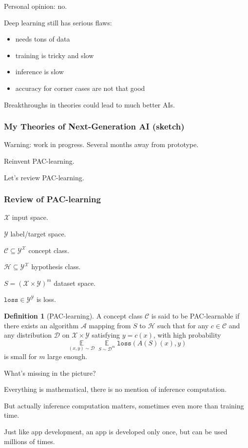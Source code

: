 \documentclass{beamer}   	%
\theoremstyle{definition}
\newtheorem*{defn}{Definition}
\newcommand{\rust}[1]{\texttt{#1}}
\newcommand{\expect}{\mathop{\mathbb{E}}}
\begin{document}
\begin{frame}
Personal opinion: no.

Deep learning still has serious flaws:
\begin{itemize}
	\item needs tons of data
	\item training is tricky and slow
	\item inference is slow
	\item accuracy for corner cases are not that good
\end{itemize}

Breakthroughs in theories could lead to much better AIs.
\end{frame}

\begin{frame}
\frametitle{My Theories of Next-Generation AI (sketch)}

Warning: work in progress. Several months away from prototype.

Reinvent PAC-learning.

Let's review PAC-learning.
\end{frame}

\begin{frame}
\frametitle{Review of PAC-learning}
$\mathcal{X}$ input space.

$\mathcal{Y}$ label/target space.

$\mathcal{C}\subseteq \mathcal{Y}^\mathcal{X}$ concept class.

$\mathcal{H}\subseteq \mathcal{Y}^\mathcal{X}$ hypothesis class.

$S=(\mathcal{X}\times \mathcal{Y})^m$ dataset space.

$\rust{loss}\in \mathcal{Y}^\mathcal{Y}$ is loss.

\begin{defn}[PAC-learning]
A concept class $\mathcal{C}$ is said to be PAC-learnable if there exists an algorithm $\mathcal{A}$ mapping from $S$ to $\mathcal{H}$ such that for any $c\in \mathcal{C}$ and any distribution $\mathcal{D}$ on $\mathcal{X}\times\mathcal{Y}$ satisfying $y=c(x)$, with high probability
\begin{equation}
	\expect\limits_{(x,y)\sim \mathcal{D}}\expect\limits_{S\sim \mathcal{D}^m}\rust{loss}(A(S)(x),y)
\end{equation}
is small for $m$ large enough.
\end{defn}
\end{frame}

\begin{frame}
What's missing in the picture?

\mbox{}

Everything is mathematical, there is no mention of inference computation.

\mbox{}

But actually inference computation matters, sometimes even more than training time.

Just like app development, an app is developed only once, but can be used millions of times.
\end{frame}
\end{document}
